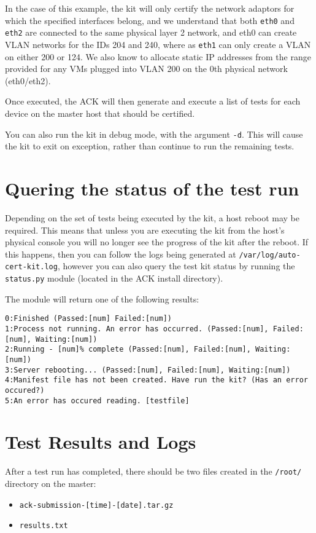 \documentclass[a4paper,11pt]{article}
\begin{document}
In the case of this example, the kit will only certify the network adaptors for which the specified interfaces belong, and we understand that both \verb=eth0= and \verb=eth2= are connected to the same physical layer 2 network, and eth0 can create VLAN networks for the IDs 204 and 240, where as \verb=eth1= can only create a VLAN on either 200 or 124. We also know to allocate static IP addresses from the range provided for any VMs plugged into VLAN 200 on the 0th physical network (eth0/eth2).

Once executed, the ACK will then generate and execute a list of tests for each device on the master host that should be certified.

You can also run the kit in debug mode, with the argument \verb=-d=. This will cause the kit to exit on exception, rather than continue to run the remaining tests.

\section{Quering the status of the test run}
Depending on the set of tests being executed by the kit, a host reboot may be required. This means that unless you are executing the kit from the host's physical console you will no longer see the progress of the kit after the reboot. If this happens, then you can follow the logs being generated at \verb=/var/log/auto-cert-kit.log=, however you can also query the test kit status by running the \verb=status.py= module (located in the ACK install directory).

The module will return one of the following results:
\begin{verbatim}
0:Finished (Passed:[num] Failed:[num])
1:Process not running. An error has occurred. (Passed:[num], Failed:[num], Waiting:[num])
2:Running - [num]% complete (Passed:[num], Failed:[num], Waiting:[num])
3:Server rebooting... (Passed:[num], Failed:[num], Waiting:[num])
4:Manifest file has not been created. Have run the kit? (Has an error occured?)
5:An error has occured reading. [testfile]
\end{verbatim}

\section{Test Results and Logs}
After a test run has completed, there should be two files created in the \verb=/root/= directory on the master:
\begin{itemize}
\item \verb=ack-submission-[time]-[date].tar.gz=
\item \verb=results.txt=
\end{itemize}
\end{document}
